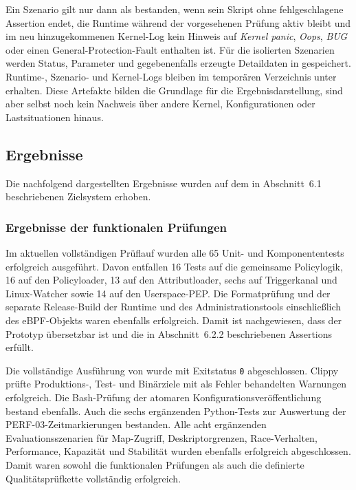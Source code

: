 Ein Szenario gilt nur dann als bestanden, wenn sein Skript ohne fehlgeschlagene Assertion endet,
die Runtime während der vorgesehenen Prüfung aktiv bleibt und im neu hinzugekommenen Kernel-Log
kein Hinweis auf \emph{Kernel panic}, \emph{Oops}, \emph{BUG} oder einen General-Protection-Fault
enthalten ist. Für die isolierten Szenarien werden Status, Parameter und gegebenenfalls erzeugte
Detaildaten in  gespeichert. Runtime-, Szenario- und Kernel-Logs bleiben im
temporären Verzeichnis unter  erhalten. Diese Artefakte bilden die Grundlage
für die Ergebnisdarstellung, sind aber selbst noch kein Nachweis über andere Kernel,
Konfigurationen oder Lastsituationen hinaus.

\clearpage
\subsection{Ergebnisse}

Die nachfolgend dargestellten Ergebnisse wurden auf dem in Abschnitt~6.1 beschriebenen
Zielsystem erhoben.

\subsubsection{Ergebnisse der funktionalen Prüfungen}

Im aktuellen vollständigen Prüflauf wurden alle 65 Unit- und Komponententests erfolgreich ausgeführt. Davon entfallen 16 Tests auf
die gemeinsame Policylogik, 16 auf den Policyloader, 13 auf den Attributloader, sechs auf
Triggerkanal und Linux-Watcher sowie 14 auf den Userspace-PEP. Die Formatprüfung und der separate
Release-Build der Runtime und des Administrationstools einschließlich des eBPF-Objekts waren
ebenfalls erfolgreich. Damit ist nachgewiesen, dass der Prototyp übersetzbar ist
und die in Abschnitt~6.2.2 beschriebenen Assertions erfüllt.

Die vollständige Ausführung von  wurde mit Exitstatus \texttt{0} abgeschlossen.
Clippy prüfte Produktions-, Test- und Binärziele mit als Fehler behandelten Warnungen erfolgreich.
Die Bash-Prüfung der atomaren Konfigurationsveröffentlichung bestand ebenfalls.
Auch die sechs ergänzenden Python-Tests zur Auswertung der PERF-03-Zeitmarkierungen bestanden.
Alle acht ergänzenden Evaluationsszenarien für Map-Zugriff, Deskriptorgrenzen, Race-Verhalten,
Performance, Kapazität und Stabilität wurden ebenfalls erfolgreich abgeschlossen.
Damit waren sowohl die funktionalen Prüfungen als auch die definierte Qualitätsprüfkette
vollständig erfolgreich.

